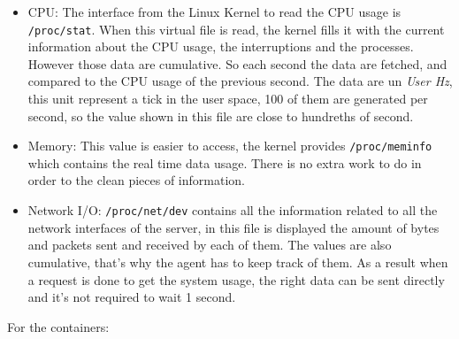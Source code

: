 \begin{itemize}
\item{CPU: The interface from the Linux Kernel to read the CPU usage is
\texttt{/proc/stat}. When this virtual file is read, the kernel fills it with
the current information about the CPU usage, the interruptions and the
processes. However those data are cumulative. So each second the data are
fetched, and compared to the CPU usage of the previous second. The data are un
\textit{User Hz}, this unit represent a tick in the user space, 100 of them are
generated per second, so the value shown in this file are close to hundreths of
second.} \item{Memory: This value is easier to access, the kernel provides
\texttt{/proc/meminfo} which contains the real time data usage. There is no
extra work to do in order to the clean pieces of information.} \item{Network
I/O: \texttt{/proc/net/dev} contains all the information related to all the
network interfaces of the server, in this file is displayed the amount of bytes
and packets sent and received by each of them. The values are also cumulative,
that's why the agent has to keep track of them. As a result when a request is
done to get the system usage, the right data can be sent directly and it's not
required to wait 1 second.}
\end{itemize}

For the containers:

